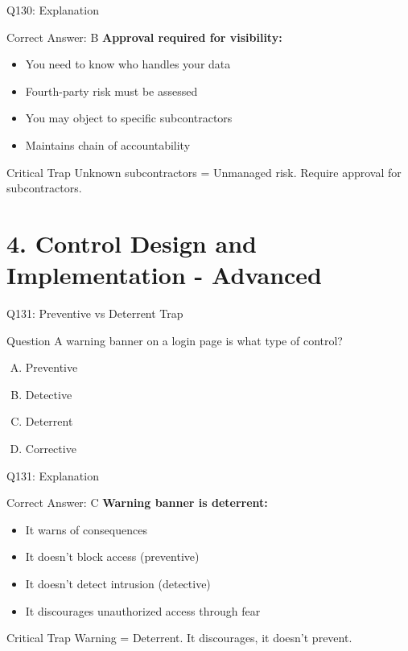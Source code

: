 \documentclass{beamer}
\begin{document}
	\begin{frame}{Q130: Explanation}
		\begin{block}{Correct Answer: B}
			\textbf{Approval required for visibility:}
			\begin{itemize}
				\item You need to know who handles your data
				\item Fourth-party risk must be assessed
				\item You may object to specific subcontractors
				\item Maintains chain of accountability
			\end{itemize}
		\end{block}
		\begin{alertblock}{Critical Trap}
			Unknown subcontractors = Unmanaged risk.
			Require approval for subcontractors.
		\end{alertblock}
	\end{frame}
	
	
	\section{4. Control Design and Implementation - Advanced}
	
	\begin{frame}{Q131: Preventive vs Deterrent Trap}
		\begin{block}{Question}
			A warning banner on a login page is what type of control?
		\end{block}
		\begin{enumerate}[(A)]
			\item Preventive
			\item Detective
			\item Deterrent
			\item Corrective
		\end{enumerate}
	\end{frame}
	
	\begin{frame}{Q131: Explanation}
		\begin{block}{Correct Answer: C}
			\textbf{Warning banner is deterrent:}
			\begin{itemize}
				\item It warns of consequences
				\item It doesn't block access (preventive)
				\item It doesn't detect intrusion (detective)
				\item It discourages unauthorized access through fear
			\end{itemize}
		\end{block}
		\begin{alertblock}{Critical Trap}
			Warning = Deterrent.
			It discourages, it doesn't prevent.
		\end{alertblock}
	\end{frame}
	
\end{document}
